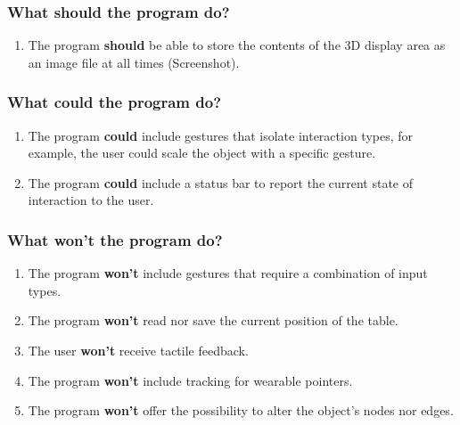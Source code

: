 \documentclass[12pt]{extarticle}
\begin{document}
\subsubsection{What should the program do?}
\begin{enumerate}
\item
The program \textbf{should} be able to store the contents of the 3D display area as an image file at all times (Screenshot).
\end{enumerate}

\subsubsection{What could the program do?}
\begin{enumerate}
\item
The program \textbf{could} include gestures that isolate interaction types, for example, the user could scale the object with a specific gesture.
\item
The program \textbf{could} include a status bar to report the current state of interaction to the user.
\end{enumerate}

\subsubsection{What won\rq{}t the program do?}
\begin{enumerate}
\item
The program \textbf{won\rq{}t} include gestures that require a combination of input types.
\item
The program \textbf{won\rq{}t} read nor save the current position of the table.
\item
The user \textbf{won\rq{}t} receive tactile feedback.
\item
The program \textbf{won\rq{}t} include tracking for wearable pointers.
\item
The program \textbf{won\rq{}t} offer the possibility to alter the object\rq{}s nodes nor edges.
\end{enumerate}
\end{document}
